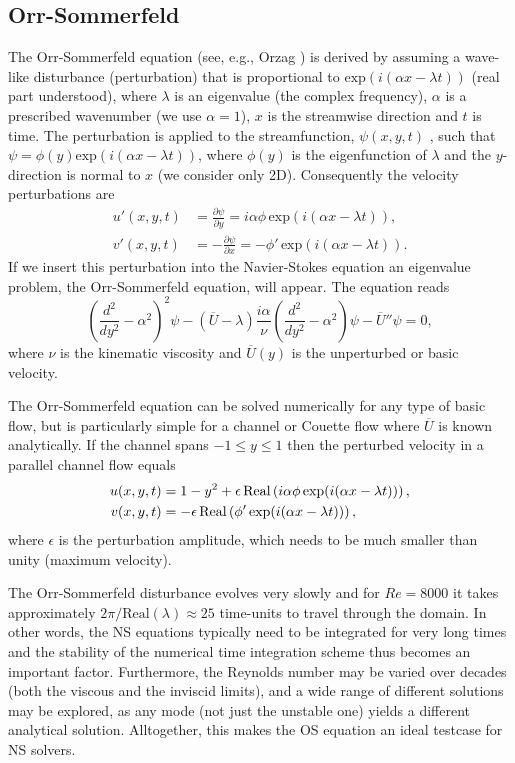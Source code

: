 \subsection{Orr-Sommerfeld}
\label{sec:OS}
The Orr-Sommerfeld equation (see, e.g., Orzag \cite{Orzag1971}) is derived by assuming a wave-like disturbance (perturbation) that is proportional to $\text{exp}(i(\alpha x-\lambda t))$ (real part understood), where $\lambda$ is an eigenvalue (the complex frequency), $\alpha$ is a prescribed wavenumber (we use $\alpha=1$), $x$ is the streamwise direction and $t$ is time. The perturbation is applied to the streamfunction, $\psi(x,y,t)$ , such that $\psi=\phi(y) \text{exp}(i(\alpha x- \lambda t))$, where $\phi(y)$ is the eigenfunction of $\lambda$ and the $y$-direction is normal to $x$ (we consider only 2D). Consequently the velocity perturbations are
\begin{align}
 u'(x,y,t)&=\frac{\partial \psi}{\partial y}=i\alpha \phi \, \text{exp}(i(\alpha x- \lambda t)),\\
 v'(x,y,t)&=-\frac{\partial \psi}{\partial x}=-\phi' \, \text{exp}(i(\alpha x- \lambda t)).
\end{align}
If we insert this perturbation into the Navier-Stokes equation an eigenvalue problem, the Orr-Sommerfeld equation, will appear. The equation reads
\begin{equation}
 \left( \frac{d^2}{dy^2}-\alpha^2\right)^2\psi - \left(\overline{U}-\lambda \right) \frac{i \alpha}{\nu} \left( \frac{d^2}{dy^2}-\alpha^2\right)\psi - \overline{U}''\psi=0,
 \label{eq:OrrS}
\end{equation}
where $\nu$ is the kinematic viscosity and $\overline{U}(y)$ is the unperturbed or basic velocity.

The Orr-Sommerfeld equation can be solved numerically for any type of basic flow, but is particularly simple for a channel or Couette flow where $\overline{U}$ is known analytically. If the channel spans $-1\leq y \leq 1$ then the perturbed velocity in a parallel channel flow equals
\begin{align}
 u(x,y,t)&=1-y^2+\epsilon \,\text{Real}\left(i\alpha \phi \, \text{exp}(i(\alpha x-\lambda t))\right), \notag \\
 v(x,y,t)&=-\epsilon \, \text{Real}\left(\phi' \, \text{exp}(i(\alpha x-\lambda t))\right),
\label{eq:channel}
\end{align}
where $\epsilon$ is the perturbation amplitude, which needs to be much smaller than unity (maximum velocity).

The Orr-Sommerfeld disturbance evolves very slowly and for $Re=8000$ it takes approximately $2 \pi/\text{Real}(\lambda)\approx 25$ time-units to travel through the domain. In other words, the NS equations typically need to be integrated for very long times and the stability of the numerical time integration scheme thus becomes an important factor. Furthermore, the Reynolds number may be varied over decades (both the viscous and the inviscid limits), and a wide range of different solutions may be explored, as any mode (not just the unstable one) yields a different analytical solution. Alltogether, this makes the OS equation an ideal testcase for NS solvers.

